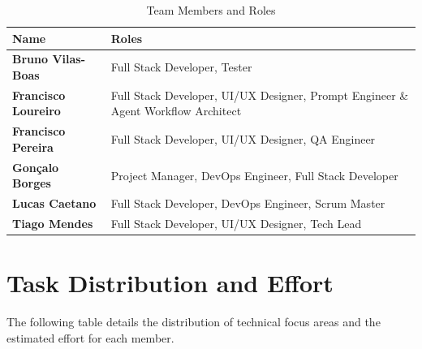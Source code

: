 \documentclass[a4paper,12pt]{report}
\begin{document}
\begin{table}[h]
    \centering
    \caption{Team Members and Roles}
    \label{tab:team_roles}
    \renewcommand{\arraystretch}{1.5}
    \begin{tabular}{|l|p{9cm}|}
        \hline
        \textbf{Name} & \textbf{Roles} \\ \hline

        \textbf{Bruno Vilas-Boas} & 
        Full Stack Developer, Tester \\ \hline

        \textbf{Francisco Loureiro} & 
        Full Stack Developer, UI/UX Designer, Prompt Engineer \& Agent Workflow Architect \\ \hline
        
        \textbf{Francisco Pereira} & 
        Full Stack Developer, UI/UX Designer, QA Engineer \\ \hline

        \textbf{Gonçalo Borges} & 
        Project Manager, DevOps Engineer, Full Stack Developer \\ \hline

        \textbf{Lucas Caetano} & 
        Full Stack Developer, DevOps Engineer, Scrum Master \\ \hline
        
        
        
        \textbf{Tiago Mendes} & 
        Full Stack Developer, UI/UX Designer, Tech Lead \\ \hline
        
        
        
        
        
        
        
    \end{tabular}
\end{table}

\newpage

\section{Task Distribution and Effort}
The following table details the distribution of technical focus areas and the estimated effort for each member.
\end{document}
